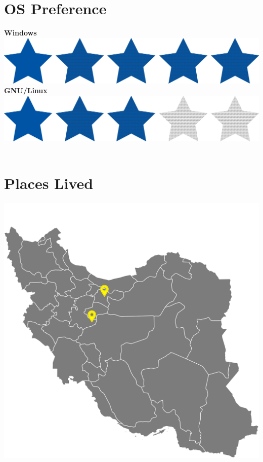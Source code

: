 \documentclass[a4paper]{friggeri-cv}
\begin{document}
\begin{aside}
  \section{OS Preference}\label{sec:os-preference}
    \textbf{Windows}\includegraphics[scale=0.33]{../assets/images/5stars.png}
    \textbf{GNU/Linux}\includegraphics[scale=0.33]{../assets/images/3stars.png}
    ~
  \section{Places Lived}\label{sec:places-lived}
    \includegraphics[scale=0.5]{../assets/images/iran.png}
    ~
\end{aside}
~
\end{document}
